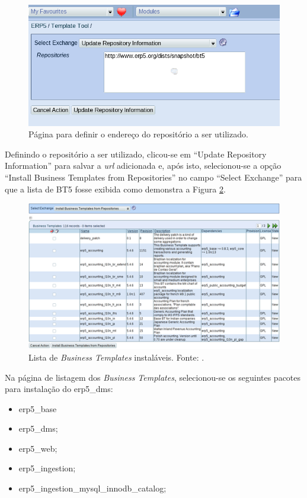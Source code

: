\begin{figure}[!ht]
\centering
\begin{center}
\includegraphics[scale=0.490,bb=0 30 510 210]{update_bt5.png}
\end{center}
\caption{Página para definir o endereço do repositório a ser utilizado.}
\label{fig:update_bt5.png}
\end{figure}

Definindo o repositório a ser utilizado, clicou-se em ``Update Repository Information'' para salvar a \textit{url} adicionada e, após isto, selecionou-se a opção ``Install Business Templates from Repositories'' no campo ``Select Exchange'' para que a lista de BT5 fosse exibida como demonstra a Figura \ref{fig:lista_bt5.png}.

\begin{figure}[!ht]
\centering
\begin{center}
\includegraphics[scale=0.620,bb=0 30 410 190]{lista_erp5.png}
\end{center}
\caption{Lista de \textit{Business Templates} instaláveis. Fonte: \cite{erp5_bt5}.}
\label{fig:lista_bt5.png}
\end{figure}

Na página de listagem dos \textit{Business Templates}, selecionou-se os seguintes pacotes para instalação do erp5\_dms:
\begin{itemize}
 \item erp5\_base
 \item erp5\_dms;
 \item erp5\_web;
 \item erp5\_ingestion;
 \item erp5\_ingestion\_mysql\_innodb\_catalog;
\end{itemize}

